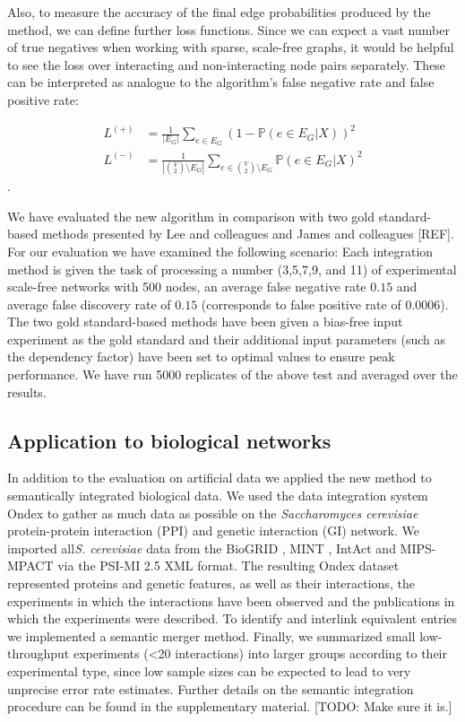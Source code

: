 \documentclass{bioinfo}
\newcommand{\prob}{\mathbb{P}}
\newcommand{\species}[1]{\textit{#1}}
\newcommand{\note}[1]{{\color{red}[#1]}}
\newcommand{\REF}{{\color{red}[REF]}}
\begin{document}
\begin{methods}
Also, to measure the accuracy of the final edge probabilities produced by the method, we can define further loss functions. Since we can expect a vast number of true negatives when working with sparse, scale-free graphs, it would be helpful to see the loss over interacting and non-interacting node pairs separately. These can be interpreted as analogue to the algorithm's false negative rate and false positive rate:

\begin{align} 
	L^{(+)} &= \frac{1}{|E_G|}\sum_{e \in E_G} (1 - \prob(e \in E_G|X))^2\\
	L^{(-)} &= \frac{1}{|\binom{V}{2} \setminus E_G|}\sum_{e \in \binom{V}{2} \setminus E_G} \prob(e \in E_G|X)^2
\end{align}.

We have evaluated the new algorithm in comparison with two gold standard-based methods presented by Lee and colleagues \citep{lee_probabilistic_2004} and James and colleagues \REF. For our evaluation we have examined the following scenario: Each integration method is given the task of processing a number (3,5,7,9, and 11) of experimental scale-free networks with 500 nodes, an average false negative rate $0.15$ and average false discovery rate of $0.15$ (corresponds to false positive rate of 0.0006). The two gold standard-based methods have been given a bias-free input experiment as the gold standard and their additional input parameters (such as the dependency factor) have been set to optimal values to ensure peak performance. We have run 5000 replicates of the above test and averaged over the results.

\subsection{Application to biological networks}

In addition to the evaluation on artificial data we applied the new method to semantically integrated biological data. We used the data integration system Ondex \citep{koehler_graph-based_2006} to gather as much data as possible on the \species{Saccharomyces cerevisiae} protein-protein interaction (PPI) and genetic interaction (GI) network. We imported all\species{S. cerevisiae} data from the BioGRID \citep{breitkreutz_biogrid_2008}, MINT \citep{chatr-aryamontri_mint:_2007}, IntAct \citep{hermjakob_intact:_2004} and MIPS-MPACT \citep{guldener_mpact:_2006} via the PSI-MI 2.5 XML \citep{kerrien_broadening_2007} format. The resulting Ondex dataset represented proteins and genetic features, as well as their interactions, the experiments in which the interactions have been observed and the publications in which the experiments were described. To identify and interlink equivalent entries we implemented a semantic merger method. Finally, we summarized small low-throughput experiments (<20 interactions) into larger groups according to their experimental type, since low sample sizes can be expected to lead to very unprecise error rate estimates. Further details on the semantic integration procedure can be found in the supplementary material. \note{TODO: Make sure it is.}


\end{methods}
\end{document}
